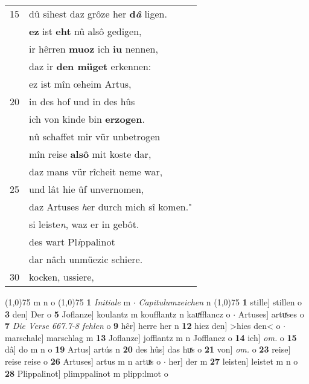 \documentclass[8pt,a4paper,notitlepage]{article}
\begin{document}
\begin{table}[ht]
\begin{minipage}[t]{0.5\linewidth}
\begin{tabular}{rl}
15 & dû sihest daz grôze her \textbf{d\textit{â}} ligen.\\ 
 & \textbf{ez} ist \textbf{eht} nû alsô gedigen,\\ 
 & ir hêrren \textbf{muoz} ich \textbf{iu} nennen,\\ 
 & daz ir \textbf{den müget} erkennen:\\ 
 & ez ist mîn œheim Artus,\\ 
20 & in des hof und in des hûs\\ 
 & ich von kinde bin \textbf{erzogen}.\\ 
 & nû schaffet mir vür unbetrogen\\ 
 & mîn reise \textbf{alsô} mit koste dar,\\ 
 & daz mans vür rîcheit neme war,\\ 
25 & und lât hie ûf unvernomen,\\ 
 & daz Artuses \textit{h}er durch mich sî komen."\\ 
 & si leiste\textit{n}, waz er in gebôt.\\ 
 & des wart Pl\textit{i}ppalinot\\ 
 & dar nâch unmüezic schiere.\\ 
30 & kocken, ussiere,\\ 
\end{tabular}
\scriptsize
\line(1,0){75} \newline
m n o \newline
\line(1,0){75} \newline
\textbf{1} \textit{Initiale} m   $\cdot$ \textit{Capitulumzeichen} n  \newline
\line(1,0){75} \newline
\textbf{1} stille] stillen o \textbf{3} den] Der o \textbf{5} Joflanze] koulantz m koufflantz n kauͯfflancz o  $\cdot$ Artuses] artuͯses o \textbf{7} \textit{Die Verse 667.7-8 fehlen} o  \textbf{9} hêr] herre her n \textbf{12} hiez den] >hies den< o  $\cdot$ marschalc] marschlag m \textbf{13} Joflanze] jofflantz m n Jofflancz o \textbf{14} ich] \textit{om.} o \textbf{15} dâ] do m n o \textbf{19} Artus] artús n \textbf{20} des hûs] das huͯs o \textbf{21} von] \textit{om.} o \textbf{23} reise] reise reise o \textbf{26} Artuses] artus m n artuͯs o  $\cdot$ her] der m \textbf{27} leisten] leistet m n o \textbf{28} Plippalinot] plimppalinot m plipp:lmot o \newline
\end{minipage}
\end{table}
\newpage
\end{document}
